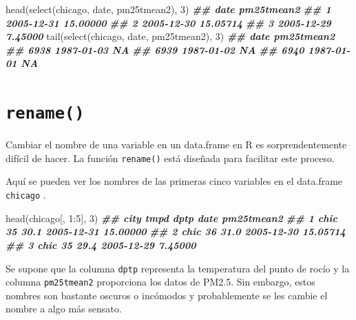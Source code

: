 \documentclass[
]{book}
\newenvironment{Shaded}{\begin{snugshade}}{\end{snugshade}}
\newcommand{\DecValTok}[1]{\textcolor[rgb]{0.00,0.00,0.81}{#1}}
\newcommand{\DocumentationTok}[1]{\textcolor[rgb]{0.56,0.35,0.01}{\textbf{\textit{#1}}}}
\newcommand{\FunctionTok}[1]{\textcolor[rgb]{0.00,0.00,0.00}{#1}}
\newcommand{\NormalTok}[1]{#1}
\newcommand{\SpecialCharTok}[1]{\textcolor[rgb]{0.00,0.00,0.00}{#1}}
\begin{document}
\begin{Shaded}
\begin{Highlighting}[]
\FunctionTok{head}\NormalTok{(}\FunctionTok{select}\NormalTok{(chicago, date, pm25tmean2), }\DecValTok{3}\NormalTok{)}
\DocumentationTok{\#\#         date pm25tmean2}
\DocumentationTok{\#\# 1 2005{-}12{-}31   15.00000}
\DocumentationTok{\#\# 2 2005{-}12{-}30   15.05714}
\DocumentationTok{\#\# 3 2005{-}12{-}29    7.45000}
\FunctionTok{tail}\NormalTok{(}\FunctionTok{select}\NormalTok{(chicago, date, pm25tmean2), }\DecValTok{3}\NormalTok{)}
\DocumentationTok{\#\#            date pm25tmean2}
\DocumentationTok{\#\# 6938 1987{-}01{-}03         NA}
\DocumentationTok{\#\# 6939 1987{-}01{-}02         NA}
\DocumentationTok{\#\# 6940 1987{-}01{-}01         NA}
\end{Highlighting}
\end{Shaded}

\hypertarget{rename}{%
\section{\texorpdfstring{\texttt{rename()}}{rename()}}\label{rename}}

Cambiar el nombre de una variable en un data.frame en R es sorprendentemente difícil de hacer. La función \texttt{rename()} está diseñada para facilitar este proceso.

Aquí se pueden ver los nombres de las primeras cinco variables en el data.frame \texttt{chicago} .

\begin{Shaded}
\begin{Highlighting}[]
\FunctionTok{head}\NormalTok{(chicago[, }\DecValTok{1}\SpecialCharTok{:}\DecValTok{5}\NormalTok{], }\DecValTok{3}\NormalTok{)}
\DocumentationTok{\#\#   city tmpd dptp       date pm25tmean2}
\DocumentationTok{\#\# 1 chic   35 30.1 2005{-}12{-}31   15.00000}
\DocumentationTok{\#\# 2 chic   36 31.0 2005{-}12{-}30   15.05714}
\DocumentationTok{\#\# 3 chic   35 29.4 2005{-}12{-}29    7.45000}
\end{Highlighting}
\end{Shaded}

Se supone que la columna \texttt{dptp} representa la temperatura del punto de rocío y la columna \texttt{pm25tmean2} proporciona los datos de PM2.5. Sin embargo, estos nombres son bastante oscuros o incómodos y probablemente se les cambie el nombre a algo más sensato.
\end{document}

